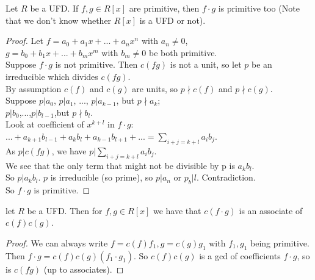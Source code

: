 \documentclass[a4paper]{article}
\begin{document}
\begin{lemma}
Let $R$ be a UFD. If $f,g\in R[x]$ are primitive, then $f\cdot g$ is primitive too (Note that we don't know whether $R[x]$ is a UFD or not).
\begin{proof}
Let $f=a_0+a_1x+...+a_nx^n$ with $a_n\neq 0$,\\
$g=b_0+b_1x+...+b_mx^m$ with $b_m\neq 0$ be both primitive.\\
Suppose $f\cdot g$ is not primitive. Then $c\left(fg\right)$ is not a unit, so let $p$ be an irreducible which divides $c\left(fg\right)$.\\
By assumption $c\left(f\right)$ and $c\left(g\right)$ are units, so $p \nmid c\left(f\right)$ and $p \nmid c\left(g\right)$.\\
Suppose $p|a_0$, $p|a_1$, ..., $p|a_{k-1}$, but $p \nmid a_k$;\\
$p|b_0$,...,$p|b_{l-1}$,but $p \nmid b_l$.\\
Look at coefficient of $x^{k+l}$ in $f\cdot g$: \\
$...+a_{k+1}b_{l-1}+a_kb_l+a_{k-1}b_{l+1}+...=\sum_{i+j=k+l} a_ib_j$.\\
As $p|c\left(fg\right)$, we have $p|\sum_{i+j=k+l}a_ib_j$.\\
We see that the only term that might not be divisible by p is $a_kb_l$.\\
So $p|a_kb_l$. $p$ is irreducible (so prime), so $p|a_n$ or $p_b|l$. Contradiction.\\
So $f\cdot g$ is primitive.
\end{proof}
\end{lemma}

\begin{coro}
let $R$ be a UFD. Then for $f,g\in R[x]$ we have that $c\left(f\cdot g\right)$ is an associate of $c\left(f\right)c\left(g\right)$.
\begin{proof}
We can always write $f=c\left(f\right)f_1, g=c\left(g\right)g_1$ with $f_1, g_1$ being primitive.\\
Then $f\cdot g=c\left(f\right)c\left(g\right)\left(f_1\cdot g_1\right)$. So $c\left(f\right)c\left(g\right)$ is a gcd of coefficients $f\cdot g$, so is $c\left(fg\right)$ (up to associates).
\end{proof}
\end{coro}
\end{document}
